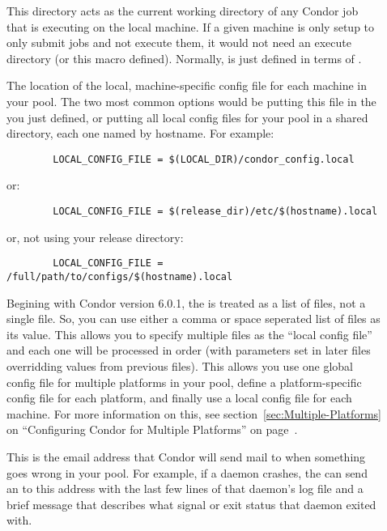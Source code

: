 \begin{description}
\item[] \label{param:Execute} This directory acts as
  the current working directory of any Condor job that is executing on
  the local machine.  If a given machine is only setup to only submit
  jobs and not execute them, it would not need an execute directory
  (or this macro defined).  Normally,  is just defined
  in terms of .
  
\item[] \label{param:LocalConfigFile} The
  location of the local, machine-specific config file for each machine
  in your pool.  The two most common options would be putting this
  file in the  you just defined, or putting all
  local config files for your pool in a shared directory, each one
  named by hostname.  For example:

\begin{verbatim}
        LOCAL_CONFIG_FILE = $(LOCAL_DIR)/condor_config.local
\end{verbatim}
  
  or:

\begin{verbatim}
        LOCAL_CONFIG_FILE = $(release_dir)/etc/$(hostname).local
\end{verbatim}
  
  or, not using your release directory:

\begin{verbatim}
        LOCAL_CONFIG_FILE = /full/path/to/configs/$(hostname).local
\end{verbatim}
  
  Begining with Condor version 6.0.1, the 
  is treated as a list of files, not a single file.  So, you can use
  either a comma or space seperated list of files as its value.  This
  allows you to specify multiple files as the ``local config file''
  and each one will be processed in order (with parameters set in
  later files overridding values from previous files).  This allows
  you use one global config file for multiple platforms in your pool,
  define a platform-specific config file for each platform, and
  finally use a local config file for each machine.  For more
  information on this, see section~\ref{sec:Multiple-Platforms} on
  ``Configuring Condor for Multiple Platforms'' on
  page~\pageref{sec:Multiple-Platforms}.

\item[] \label{param:CondorAdmin} This is the email
  address that Condor will send mail to when something goes wrong in
  your pool.  For example, if a daemon crashes, the 
  can send an  to this address with the last few lines
  of that daemon's log file and a brief message that describes what
  signal or exit status that daemon exited with.
  

\end{description}
